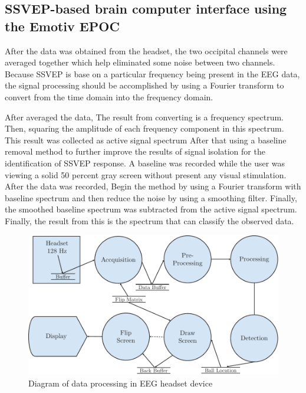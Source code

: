 \subsection {SSVEP-based brain computer interface using the Emotiv EPOC\cite{ref6}}

\hspace{1.5cm} After the data was obtained from the headset, the two occipital channels were averaged together which help eliminated some noise between two channels. Because SSVEP is base on a particular frequency being present in the EEG data, the signal processing should be accomplished by using a Fourier transform to convert from the time domain into the frequency domain. 
\par After averaged the data, The result from converting is a frequency spectrum. Then, squaring the amplitude of each frequency component in this spectrum. This result was collected as active signal spectrum After that using a baseline removal method to further improve the results of signal isolation for the identification of SSVEP response. A baseline was recorded while the user was viewing a solid 50 percent gray screen without present any visual stimulation. After the data was recorded, Begin the method by using a Fourier transform with baseline spectrum and then reduce the noise by using a smoothing filter. Finally, the smoothed baseline spectrum was subtracted from the active signal spectrum. Finally, the result from this is the spectrum that can classify the observed data.\\ 

\begin{figure}[ht]
	\centering
	\includegraphics[scale = 0.8]{chapter2/29.pdf}
	\caption{Diagram of data processing in EEG headset device \cite{ref6}}
\end{figure}

